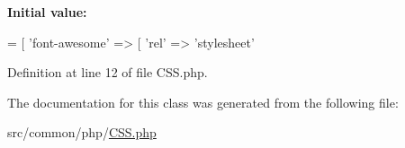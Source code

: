 {\bfseries Initial value\+:}
\begin{DoxyCode}
= [
        \textcolor{stringliteral}{'font-awesome'} => [
            \textcolor{stringliteral}{'rel'} => \textcolor{stringliteral}{'stylesheet'}
\end{DoxyCode}


Definition at line 12 of file C\+S\+S.\+php.



The documentation for this class was generated from the following file\+:\begin{DoxyCompactItemize}
\item 
src/common/php/\hyperlink{CSS_8php}{C\+S\+S.\+php}\end{DoxyCompactItemize}
